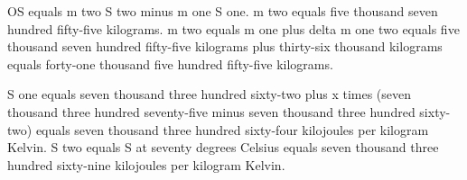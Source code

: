 OS equals m two S two minus m one S one.  
m two equals five thousand seven hundred fifty-five kilograms.  
m two equals m one plus delta m one two equals five thousand seven hundred fifty-five kilograms plus thirty-six thousand kilograms equals forty-one thousand five hundred fifty-five kilograms.  

S one equals seven thousand three hundred sixty-two plus x times (seven thousand three hundred seventy-five minus seven thousand three hundred sixty-two) equals seven thousand three hundred sixty-four kilojoules per kilogram Kelvin.  
S two equals S at seventy degrees Celsius equals seven thousand three hundred sixty-nine kilojoules per kilogram Kelvin.